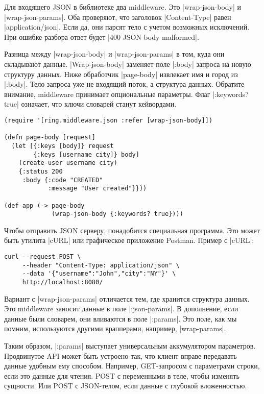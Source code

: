 Для входящего JSON в библиотеке два middleware. Это \spverb|wrap-json-body| и
\spverb|wrap-json-params|. Оба проверяют, что заголовок \spverb|Content-Type|
равен \spverb|application/json|. Если да, они парсят тело с учетом возможных
исключений. При ошибке разбора ответ будет \spverb|400 JSON body malformed|.

Разница между \spverb|wrap-json-body| и \spverb|wrap-json-params| в том, куда
они складывают данные. \spverb|Wrap-json-body| заменяет поле \spverb|:body|
запроса на новую структуру данных. Ниже обработчик \spverb|page-body| извлекает
имя и город из \spverb|:body|. Тело запроса уже не входящий поток, а структура
данных. Обратите внимание, middleware принимает опциональные параметры. Флаг
\spverb|:keywords? true| означает, что ключи словарей станут кейвордами.

\begin{verbatim}
(require '[ring.middleware.json :refer [wrap-json-body]])

(defn page-body [request]
  (let [{:keys [body]} request
        {:keys [username city]} body]
    (create-user username city)
    {:status 200
     :body {:code "CREATED"
            :message "User created"}}))

(def app (-> page-body
             (wrap-json-body {:keywords? true})))
\end{verbatim}

Чтобы отправить JSON серверу, понадобится специальная программа. Это
может быть утилита \spverb|cURL| или графическое приложение Postman. Пример с \spverb|cURL|:

\begin{verbatim}
curl --request POST \
     --header "Content-Type: application/json" \
     --data '{"username":"John","city":"NY"}' \
     http://localhost:8080/
\end{verbatim}

Вариант с \spverb|wrap-json-params| отличается тем, где хранится структура данных. Это
middleware заносит данные в поле \spverb|:json-params|. В дополнение, если данные были
словарем, они вливаются в поле \spverb|:params|. Это поле, как мы помним, используются
другими врапперами, например, \spverb|wrap-params|.

Таким образом, \spverb|:params| выступает универсальным аккумулятором
параметров. Продвинутое API может быть устроено так, что клиент вправе
передавать данные удобным ему способом. Например, GET-запросом с параметрами
строки, если это данные для чтения. POST с переменными в теле, чтобы изменять
сущности. Или POST с JSON-телом, если данные с глубокой вложенностью.

